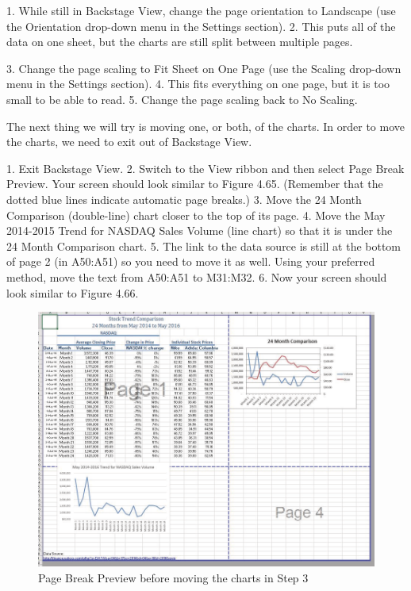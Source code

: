 1. While still in Backstage View, change the page orientation to Landscape (use the Orientation
drop-down menu in the Settings section).
2. This puts all of the data on one sheet, but the charts are still split between multiple pages.


3. Change the page scaling to Fit Sheet on One Page (use the Scaling drop-down menu in the
Settings section).
4. This fits everything on one page, but it is too small to be able to read.
5. Change the page scaling back to No Scaling.

The next thing we will try is moving one, or both, of the charts. In order to move the charts, we need
to exit out of Backstage View.

1. Exit Backstage View.
2. Switch to the View ribbon and then select Page Break Preview. Your screen should look similar
to Figure 4.65. (Remember that the dotted blue lines indicate automatic page breaks.)
3. Move the 24 Month Comparison (double-line) chart closer to the top of its page.
4. Move the May 2014-2015 Trend for NASDAQ Sales Volume (line chart) so that it is under the
24 Month Comparison chart.
5. The link to the data source is still at the bottom of page 2 (in A50:A51) so you need to move it as
well. Using your preferred method, move the text from A50:A51 to M31:M32.
6. Now your screen should look similar to Figure 4.66.


\begin{figure}[H]
	\centering
	\includegraphics[width=\maxwidth{.95\linewidth}]{gfx/ch04_fig52}
	\caption{Page Break Preview before moving the charts in Step 3}
	\label{04:fig52}
\end{figure}

